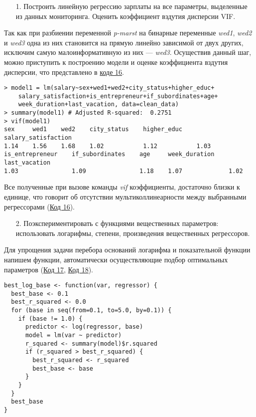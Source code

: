 \begin{enumerate}
    \item[1.] Построить линейную регрессию зарплаты на все параметры, выделенные из данных мониторинга. Оценить коэффициент вздутия дисперсии VIF.
\end{enumerate}

Так как при разбиении переменной \textit{p-marst} на бинарные переменные \textit{wed1}, \textit{wed2} и \textit{wed3} одна из них становится на прямую линейно зависимой от двух других, исключим самую малоинформативную из них --- \textit{wed3}. Осуществив  данный шаг, можно приступить к построению модели и оценке коэффициента вздутия дисперсии, что представлено в \hyperref[code:16]{коде 16}.

\begin{code}
\begin{verbatim}
> model1 = lm(salary~sex+wed1+wed2+city_status+higher_educ+
    salary_satisfaction+is_entrepreneur+if_subordinates+age+
    week_duration+last_vacation, data=clean_data)
> summary(model1) # Adjusted R-squared:  0.2751
> vif(model1)
sex     wed1    wed2    city_status    higher_educ    salary_satisfaction 
1.14    1.56    1.68    1.02           1.12           1.03 
is_entrepreneur    if_subordinates    age     week_duration    last_vacation 
1.03               1.09               1.18    1.07             1.02 
\end{verbatim}
\label{code:16}
\end{code}

Все полученные при вызове команды \textit{vif} коэффициенты, достаточно близки к единице, что говорит об отсутствии мультиколлинеарности между выбранными регрессорами (\hyperref[code:16]{Код 16}). 

\begin{enumerate}
    \item[2.] Поэкспериментировать с функциями вещественных параметров: использовать логарифмы, степени, произведения вещественных регрессоров.
\end{enumerate}

Для упрощения задачи перебора оснований логарифма и показательной функции напишем функции, автоматически осуществляющие подбор оптимальных параметров (\hyperref[code:17]{Код 17}, \hyperref[code:18]{Код 18}).

\begin{code}
\begin{verbatim}
best_log_base <- function(var, regressor) {
  best_base <- 0.1
  best_r_squared <- 0.0
  for (base in seq(from=0.1, to=5.0, by=0.1)) {
    if (base != 1.0) {
      predictor <- log(regressor, base)
      model = lm(var ~ predictor)
      r_squared <- summary(model)$r.squared
      if (r_squared > best_r_squared) {
        best_r_squared <- r_squared
        best_base <- base
      }
    }
  }
  best_base
}
\end{verbatim}
\label{code:17}
\end{code}

